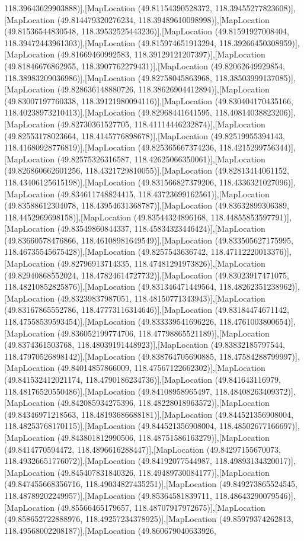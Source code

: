118.39643629903888)],[MapLocation (49.81154390528372, 118.39455277823608)],[MapLocation (49.814479320276234, 118.39489610098998)],[MapLocation (49.81536544830548, 118.39532525443236)],[MapLocation (49.81591927008404, 118.39472443961303)],[MapLocation (49.815974651913294, 118.39266450308959)],[MapLocation (49.81669460992583, 118.39129121207397)],[MapLocation (49.81846676862955, 118.3907762279431)],[MapLocation (49.82062649929854, 118.38983209036986)],[MapLocation (49.82758045863968, 118.38503999137085)],[MapLocation (49.828636148880726, 118.38626904412894)],[MapLocation (49.83007197760338, 118.39121980094116)],[MapLocation (49.830404170435166, 118.40238973210413)],[MapLocation (49.82968441641595, 118.40814038823206)],[MapLocation (49.82730361527705, 118.41114446232874)],[MapLocation (49.82553178023664, 118.4145776898678)],[MapLocation (49.82519955394143, 118.41680928776819)],[MapLocation (49.825365667374236, 118.4215299756344)],[MapLocation (49.82575326316587, 118.42625066350061)],[MapLocation (49.826860662601256, 118.4321729810055)],[MapLocation (49.82813414061152, 118.43406125615198)],[MapLocation (49.831566827379206, 118.4336321027096)],[MapLocation (49.834611748824415, 118.43723699162561)],[MapLocation (49.83588612304078, 118.43954631368787)],[MapLocation (49.83632899306389, 118.4452969698158)],[MapLocation (49.83544324896168, 118.44855853597791)],[MapLocation (49.83549860844337, 118.45834323446424)],[MapLocation (49.83660578476866, 118.46108981649549)],[MapLocation (49.833505627175995, 118.46735545675428)],[MapLocation (49.8257543636742, 118.47112220013376)],[MapLocation (49.82796913714335, 118.47481291973826)],[MapLocation (49.82940868552024, 118.47824614727732)],[MapLocation (49.83023917471075, 118.48210852825876)],[MapLocation (49.831346471449564, 118.48262351238962)],[MapLocation (49.83239837987051, 118.48150771343943)],[MapLocation (49.83167865552786, 118.47773116314646)],[MapLocation (49.83184474671142, 118.47558539593454)],[MapLocation (49.833339541696226, 118.4761003800654)],[MapLocation (49.836052199774706, 118.47798865521189)],[MapLocation (49.8374361503768, 118.48039191448923)],[MapLocation (49.83832185797544, 118.47970526898142)],[MapLocation (49.838764705690885, 118.47584288799997)],[MapLocation (49.84014857866009, 118.47567122662302)],[MapLocation (49.841532412021174, 118.4790186234736)],[MapLocation (49.841643116979, 118.48176520550486)],[MapLocation (49.84108958965497, 118.48408263409372)],[MapLocation (49.842085934275396, 118.48228018963572)],[MapLocation (49.84346971218563, 118.48193686688181)],[MapLocation (49.844521356908004, 118.48253768170115)],[MapLocation (49.844521356908004, 118.48502677166697)],[MapLocation (49.843801812990506, 118.48751586163279)],[MapLocation (49.8414770594472, 118.4896616288447)],[MapLocation (49.84297155670073, 118.49326651776072)],[MapLocation (49.84192077544987, 118.49893134320017)],[MapLocation (49.845407831840326, 118.49489730084177)],[MapLocation (49.847455668356716, 118.49034827435251)],[MapLocation (49.849273865524545, 118.48789202249957)],[MapLocation (49.85364581839711, 118.48643290079546)],[MapLocation (49.85566465179657, 118.48707917972675)],[MapLocation (49.858652722888976, 118.49257234378925)],[MapLocation (49.85979374262813, 118.49568002208187)],[MapLocation (49.860679040633926, 